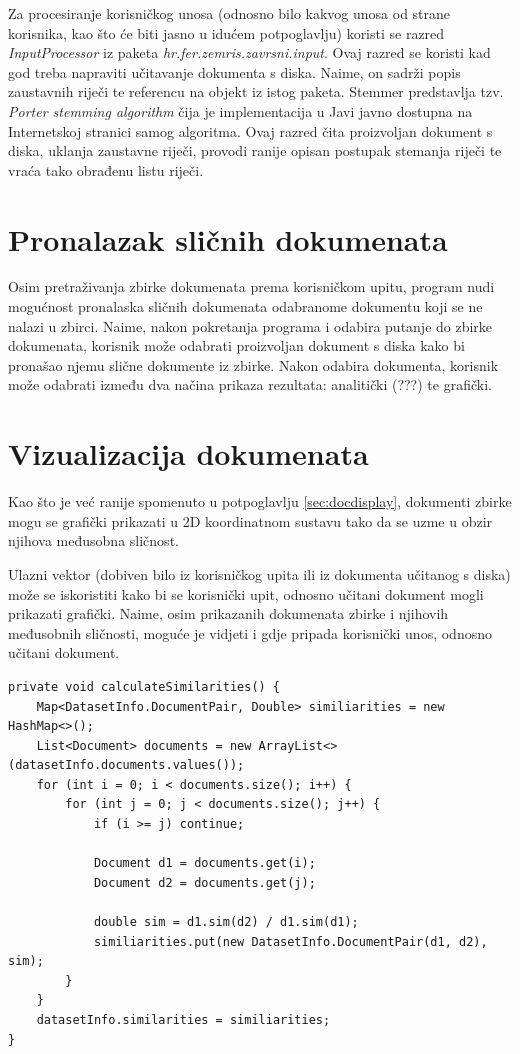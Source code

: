 \documentclass[times, utf8, zavrsni]{fer}
\begin{document}
Za procesiranje korisničkog unosa (odnosno bilo kakvog unosa od strane korisnika, kao što će biti jasno u idućem potpoglavlju) koristi se razred \textit{InputProcessor} iz paketa \textit{hr.fer.zemris.zavrsni.input}. Ovaj razred se koristi kad god treba napraviti učitavanje dokumenta s diska. Naime, on sadrži popis zaustavnih riječi te referencu na objekt  iz istog paketa. Stemmer predstavlja tzv. \textit{Porter stemming algorithm} čija je implementacija u Javi javno dostupna na Internetskoj stranici samog algoritma. Ovaj razred čita proizvoljan dokument s diska, uklanja zaustavne riječi,  provodi ranije opisan postupak stemanja riječi te vraća tako obrađenu listu riječi.

\section{Pronalazak sličnih dokumenata}
Osim pretraživanja zbirke dokumenata prema korisničkom upitu, program nudi mogućnost pronalaska sličnih dokumenata odabranome dokumentu koji se ne nalazi u zbirci. Naime, nakon pokretanja programa i odabira putanje do zbirke dokumenata, korisnik može odabrati proizvoljan dokument s diska kako bi pronašao njemu slične dokumente iz zbirke. Nakon odabira dokumenta, korisnik može odabrati između dva načina prikaza rezultata: analitički (???) te grafički.

\section{Vizualizacija dokumenata}
Kao što je već ranije spomenuto u potpoglavlju \ref{sec:docdisplay}, dokumenti zbirke mogu se grafički prikazati u 2D koordinatnom sustavu tako da se uzme u obzir njihova međusobna sličnost.

Ulazni vektor (dobiven bilo iz korisničkog upita ili iz dokumenta učitanog s diska) može se iskoristiti kako bi se korisnički upit, odnosno učitani dokument mogli prikazati grafički. Naime, osim prikazanih dokumenata zbirke i njihovih međusobnih sličnosti, moguće je vidjeti i gdje pripada korisnički unos, odnosno učitani dokument.

\begin{lstlisting}[caption={Isječak programskog koda za generičku usporedbu dokumenata},captionpos=b]
private void calculateSimilarities() {
    Map<DatasetInfo.DocumentPair, Double> similiarities = new HashMap<>();
    List<Document> documents = new ArrayList<>(datasetInfo.documents.values());
    for (int i = 0; i < documents.size(); i++) {
        for (int j = 0; j < documents.size(); j++) {
            if (i >= j) continue;

            Document d1 = documents.get(i);
            Document d2 = documents.get(j);

            double sim = d1.sim(d2) / d1.sim(d1);
            similiarities.put(new DatasetInfo.DocumentPair(d1, d2), sim);
        }
    }
    datasetInfo.similarities = similiarities;
}
\end{lstlisting}
\end{document}
